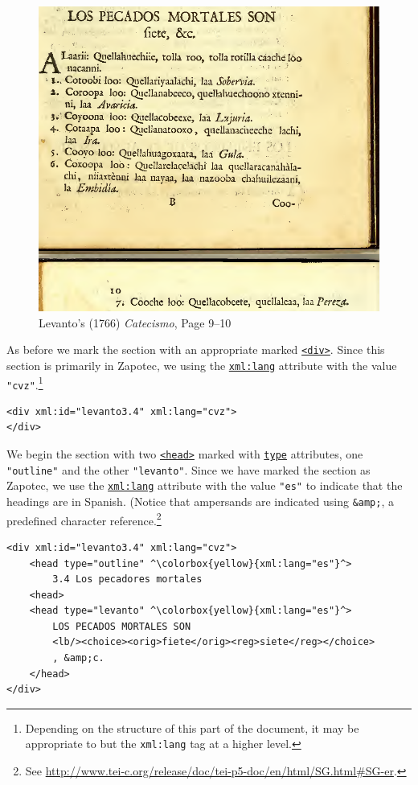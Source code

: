 \documentclass[12pt,a4paper]{article}
\begin{document}
\begin{figure}[h]
\centerline{\includegraphics[scale=0.55]{Levanto1766_Page9} }
\caption{Levanto's (1766) \emph{Catecismo}, Page 9--10}
\end{figure}

As before we mark the section with an appropriate marked \hyperref[tag-sec:div]{\texttt{<div>}}.  Since this section is primarily in Zapotec, we using the \hyperref[att-sec:xml:lang]{\texttt{xml:lang}} attribute with the value \texttt{"cvz"}.\footnote{Depending on the structure of this part of the document, it may be appropriate to but the \texttt{xml:lang} tag at a higher level.}

\begin{lstlisting}
<div xml:id="levanto3.4" xml:lang="cvz">
</div>
\end{lstlisting}

We begin the section with two \hyperref[tag-sec:head]{\texttt{<head>}} marked with \hyperref[att-sec:type]{\texttt{type}} attributes, one \texttt{"outline"} and the other \texttt{"levanto"}.  Since we have marked the section as Zapotec, we use the \hyperref[att-sec:xml:lang]{\texttt{xml:lang}} attribute with the value \texttt{"es"} to indicate that the headings are in Spanish.  (Notice that ampersands are indicated using \texttt{\&amp;}, a predefined character reference.\footnote{See \url{http://www.tei-c.org/release/doc/tei-p5-doc/en/html/SG.html\#SG-er}.}

\begin{lstlisting}
<div xml:id="levanto3.4" xml:lang="cvz">
	<head type="outline" ^\colorbox{yellow}{xml:lang="es"}^>
		3.4 Los pecadores mortales
	<head>
	<head type="levanto" ^\colorbox{yellow}{xml:lang="es"}^>
		LOS PECADOS MORTALES SON
		<lb/><choice><orig>fiete</orig><reg>siete</reg></choice>
		, &amp;c.
	</head>
</div>
\end{lstlisting}
\end{document}
